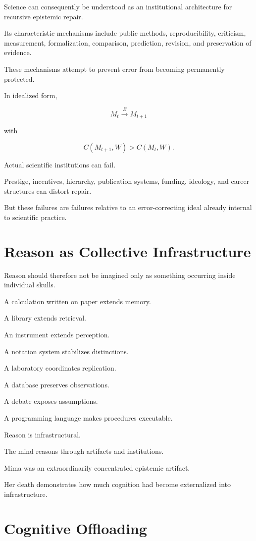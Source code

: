 \documentclass[11pt,oneside]{book}
\theoremstyle{definition}
\theoremstyle{remark}
\begin{document}
Science can consequently be understood as an institutional architecture for recursive epistemic repair.

Its characteristic mechanisms include public methods, reproducibility, criticism, measurement, formalization, comparison, prediction, revision, and preservation of evidence.

These mechanisms attempt to prevent error from becoming permanently protected.

In idealized form,

\[
M_t
\xrightarrow{E}
M_{t+1}
\]

with

\[
C(M_{t+1},W)
>
C(M_t,W).
\]

Actual scientific institutions can fail.

Prestige, incentives, hierarchy, publication systems, funding, ideology, and career structures can distort repair.

But these failures are failures relative to an error-correcting ideal already internal to scientific practice.

\section{Reason as Collective Infrastructure}

Reason should therefore not be imagined only as something occurring inside individual skulls.

A calculation written on paper extends memory.

A library extends retrieval.

An instrument extends perception.

A notation system stabilizes distinctions.

A laboratory coordinates replication.

A database preserves observations.

A debate exposes assumptions.

A programming language makes procedures executable.

Reason is infrastructural.

The mind reasons through artifacts and institutions.

Mima was an extraordinarily concentrated epistemic artifact.

Her death demonstrates how much cognition had become externalized into infrastructure.

\section{Cognitive Offloading}
\end{document}
